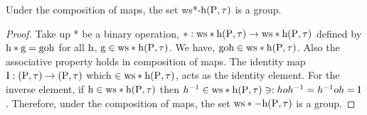 \begin{thm}\label{thm5.2.9}
Under the composition of maps, the set ws*-$\mathrm{h}(\mathrm{P}, \tau)$ is a group.
\end{thm}

\begin{proof}
Take up * be a binary operation, $*: \mathrm{ws} * \mathrm{h}(\mathrm{P}, \tau) \to  \mathrm{ws} * \mathrm{h}(\mathrm{P}, \tau)$ defined by $\mathrm{h} * \mathrm{g} = \text{goh}$ for all $\mathrm{h}$, $\mathrm{g} \in \mathrm{ws} * \mathrm{h}(\mathrm{P}, \tau)$. We have, $\text{goh} \in \mathrm{ws} * \mathrm{h}(\mathrm{P},\tau)$. Also the associative property holds in composition of maps. The identity map $\mathrm{I} : (\mathrm{P}, \tau) \to  (\mathrm{P}, \tau)$ which $\in \mathrm{ws} *\mathrm{h}(\mathrm{P}, \tau)$, acts as the identity element. For the inverse element, if $\mathrm{h} \in \mathrm{ws} * \mathrm{h}(\mathrm{P},\tau)$ then $h^{-1} \in \mathrm{ws} * \mathrm{h}(\mathrm{P},\tau) \ni: hoh^{-1}=h^{-1}oh=\mathrm{I}$. Therefore, under the composition of maps, the set $\mathrm{ws} *-\mathrm{h}(\mathrm{P},\tau)$ is a group.
\end{proof}

